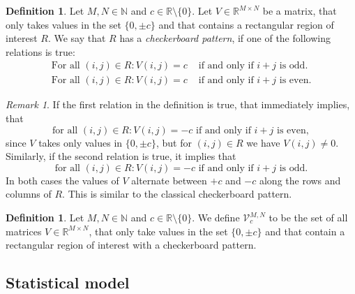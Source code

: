 \documentclass[a4paper,12pt]{article}
\theoremstyle{plain}
\theoremstyle{definition}
\newtheorem{definition}[theorem]{Definition}
\theoremstyle{remark}
\newtheorem{remark}[theorem]{Remark}
\begin{document}
\begin{definition}
	Let $M, N \in \mathbb{N}$ and $c \in \mathbb{R} \setminus \{ 0 \}$. Let $V \in \mathbb{R}^{M \times N}$ be a matrix, that only takes values in the set $\{ 0, \pm c \}$ and that contains a rectangular region of interest $R$. We say that $R$ has a \emph{checkerboard pattern}, if one of the following relations is true:
	\begin{subequations}
		\begin{align}
			\textrm{For all } (i, j) \in R: V(i, j) = c &\textrm{ if and only if } i + j \textrm{ is odd}.\\
			\textrm{For all } (i, j) \in R: V(i, j) = c &\textrm{ if and only if } i + j \textrm{ is even}.
		\end{align}
	\end{subequations}
\end{definition}

\begin{remark}
	If the first relation in the definition is true, that immediately implies, that
	\begin{equation*}
		\textrm{for all } (i, j) \in R: V(i, j) = - c \textrm{ if and only if } i + j \textrm{ is even},
	\end{equation*}
	since $V$ takes only values in $\{ 0, \pm c \}$, but for $(i, j) \in R$ we have $V(i,j) \neq 0$.
	Similarly, if the second relation is true, it implies that
	\begin{equation*}
		\textrm{for all } (i, j) \in R: V(i, j) = - c \textrm{ if and only if } i + j \textrm{ is odd}.
	\end{equation*}
	In both cases the values of $V$ alternate between $+c$ and $-c$ along the rows and columns of $R$. This is similar to the classical checkerboard pattern.
\end{remark}

\begin{definition}
	Let $M, N \in \mathbb{N}$ and $c \in \mathbb{R} \setminus \{ 0 \}$. We define $\mathcal{V}_c^{M, N}$ to be the set of all matrices $V \in \mathbb{R}^{M \times N}$, that only take values in the set $\{ 0, \pm c \}$ and that contain a rectangular region of interest with a checkerboard pattern.
\end{definition}

\newpage

\subsection{Statistical model}
\end{document}
